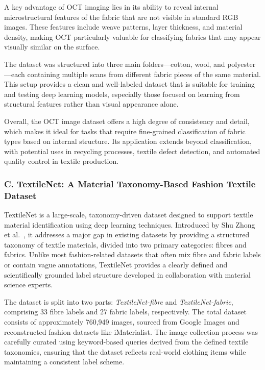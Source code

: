 A key advantage of OCT imaging lies in its ability to reveal internal microstructural features of the fabric that are not visible in standard RGB images. These features include weave patterns, layer thickness, and material density, making OCT particularly valuable for classifying fabrics that may appear visually similar on the surface.

The dataset was structured into three main folders—cotton, wool, and polyester—each containing multiple scans from different fabric pieces of the same material. This setup provides a clean and well-labeled dataset that is suitable for training and testing deep learning models, especially those focused on learning from structural features rather than visual appearance alone.

Overall, the OCT image dataset offers a high degree of consistency and detail, which makes it ideal for tasks that require fine-grained classification of fabric types based on internal structure. Its application extends beyond classification, with potential uses in recycling processes, textile defect detection, and automated quality control in textile production.

\subsubsection{C. TextileNet: A Material Taxonomy-Based Fashion Textile Dataset}

TextileNet is a large-scale, taxonomy-driven dataset designed to support textile material identification using deep learning techniques. Introduced by Shu Zhong et al.~\cite{zhong2023textilenet}, it addresses a major gap in existing datasets by providing a structured taxonomy of textile materials, divided into two primary categories: fibres and fabrics. Unlike most fashion-related datasets that often mix fibre and fabric labels or contain vague annotations, TextileNet provides a clearly defined and scientifically grounded label structure developed in collaboration with material science experts.

The dataset is split into two parts: \textit{TextileNet-fibre} and \textit{TextileNet-fabric}, comprising 33 fibre labels and 27 fabric labels, respectively. The total dataset consists of approximately 760,949 images, sourced from Google Images and reconstructed fashion datasets like iMaterialist. The image collection process was carefully curated using keyword-based queries derived from the defined textile taxonomies, ensuring that the dataset reflects real-world clothing items while maintaining a consistent label scheme.

